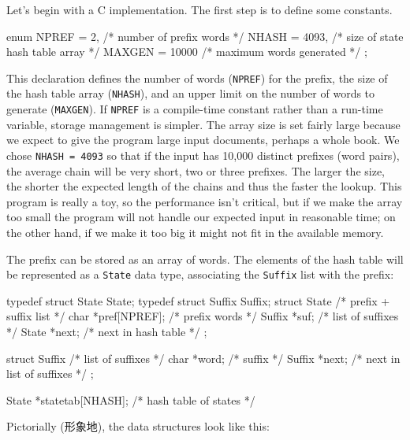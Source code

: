 Let's begin with a C implementation. The first step is to define some
constants.
\begin{wellcode}
    enum {
        NPREF   = 2,        /* number of prefix words */
        NHASH   = 4093,     /* size of state hash table array */
        MAXGEN  = 10000     /* maximum words generated */
    };
\end{wellcode}
This declaration defines the number of words (\verb'NPREF') for the prefix,
the size of the hash table array (\verb'NHASH'), and an upper limit on the
number of words to generate (\verb'MAXGEN'). If \verb'NPREF' is a
compile-time constant rather than a run-time variable, storage management
is simpler. The array size is set fairly large because we expect to give
the program large input documents, perhaps a whole book. We chose
\verb'NHASH = 4093' so that if the input has 10,000 distinct prefixes (word
pairs), the average chain will be very short, two or three prefixes. The
larger the size, the shorter the expected length of the chains and thus the
faster the lookup. This program is really a toy, so the performance isn't
critical, but if we make the array too small the program will not handle
our expected input in reasonable time; on the other hand, if we make it too
big it might not fit in the available memory.

The prefix can be stored as an array of words. The elements of the hash
table will be represented as a \verb'State' data type, associating the
\verb'Suffix' list with the prefix:
\begin{wellcode}
    typedef struct State State;
    typedef struct Suffix Suffix;
    struct State {  /* prefix + suffix list */
        char    *pref[NPREF];   /* prefix words */
        Suffix  *suf;           /* list of suffixes */
        State   *next;          /* next in hash table */
    };

    struct Suffix { /* list of suffixes */
        char    *word;  /* suffix */
        Suffix  *next;  /* next in list of suffixes */
    };

    State   *statetab[NHASH];   /* hash table of states */
\end{wellcode}
Pictorially (形象地), the data structures look like this:

